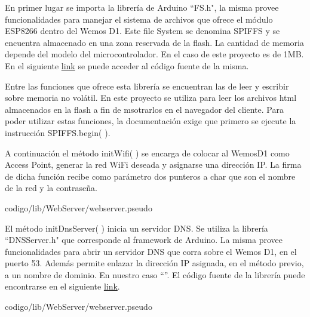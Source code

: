         En primer lugar se importa la librería de Arduino ``FS.h", la misma provee funcionalidades para manejar el sistema de archivos que ofrece el módulo ESP8266 dentro del Wemos D1. Este file System se denomina SPIFFS y se encuentra almacenado en una zona reservada de la flash. La cantidad de memoria depende del modelo del microcontrolador. En el caso de este proyecto es de 1MB. En el siguiente \href{https://github.com/esp8266/Arduino/blob/master/cores/esp8266/FS.h}{link} se puede acceder al código fuente de la misma.
    
        Entre las funciones que ofrece esta librería se encuentran las de leer y escribir sobre memoria no volátil. En este proyecto se utiliza para leer los archivos html almacenados en la flash a fin de msotrarlos en el navegador del cliente. Para poder utilizar estas funciones, la documentación exige que primero se ejecute la instrucción SPIFFS.begin( ).
    
        A continuación el método initWifi( ) se encarga de colocar al WemosD1 como Access Point, generar la red WiFi deseada y asignarse una dirección IP. La firma de dicha función recibe como parámetro dos punteros a char que son el nombre de la red y la contraseña.
    
        
                         {codigo/lib/WebServer/webserver.pseudo}
                         
        El método initDnsServer( ) inicia un servidor DNS. Se utiliza la librería ``DNSServer.h" que corresponde al framework de Arduino. La misma provee funcionalidades para abrir un servidor DNS que corra sobre el Wemos D1, en el puerto 53. Además permite enlazar la dirección IP asignada, en el método previo, a un nombre de dominio. En nuestro caso \enquote{\pagDNS}. El código fuente de la librería puede encontrarse en el siguiente \href{https://github.com/esp8266/Arduino/blob/master/libraries/DNSServer/src/DNSServer.h}{link}.
    
        
                         {codigo/lib/WebServer/webserver.pseudo}
                         
